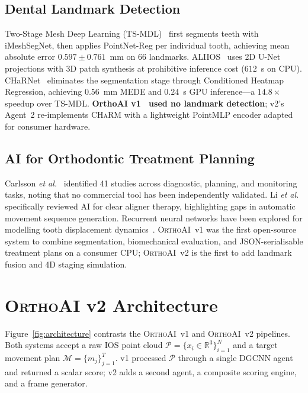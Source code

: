 \documentclass[10pt,twocolumn]{article}
\newcommand{\orthoai}{\textsc{OrthoAI}}
\newcommand{\charm}{\textsc{CHaRM}}
\newcommand{\dgcnn}{\textsc{DGCNN}}
\newcommand{\R}{\mathbb{R}}
\newcommand{\vone}{\orthoai{}~v1}
\newcommand{\vtwo}{\orthoai{}~v2}
\begin{document}
\subsection{Dental Landmark Detection}

Two-Stage Mesh Deep Learning (TS-MDL)~\cite{wu2022tsmdl} first segments
teeth with iMeshSegNet, then applies PointNet-Reg per individual tooth,
achieving mean absolute error $0.597 \pm 0.761$~mm on 66 landmarks.
ALIIOS~\cite{baquero2022aliios} uses 2D U-Net projections with 3D patch
synthesis at prohibitive inference cost ($612$~s on CPU).
CHaRNet~\cite{rodriguez2025charm} eliminates the segmentation stage through
Conditioned Heatmap Regression, achieving $0.56$~mm MEDE and $0.24$~s GPU
inference---a $14.8\times$ speedup over TS-MDL.
\textbf{OrthoAI v1~\cite{lansiaux2026orthoaiv1} used no landmark detection};
v2's Agent~2 re-implements \charm{} with a lightweight PointMLP encoder
adapted for consumer hardware.

\subsection{AI for Orthodontic Treatment Planning}

Carlsson \textit{et al.}~\cite{carlsson2024ai} identified 41 studies across
diagnostic, planning, and monitoring tasks, noting that no commercial tool
has been independently validated.
Li \textit{et al.}~\cite{li2025clear} specifically reviewed AI for clear
aligner therapy, highlighting gaps in automatic movement sequence generation.
Recurrent neural networks have been explored for modelling tooth displacement
dynamics~\cite{woo2020virtual}.
\vone{} was the first open-source system to combine segmentation, biomechanical
evaluation, and JSON-serialisable treatment plans on a consumer CPU;
\vtwo{} is the first to add landmark fusion and 4D staging simulation.

\section{\orthoai{} v2 Architecture}
\label{sec:arch}

Figure~\ref{fig:architecture} contrasts the \vone{} and \vtwo{} pipelines.
Both systems accept a raw IOS point cloud
$\mathcal{P} = \{x_i \in \R^3\}_{i=1}^N$
and a target movement plan $\mathcal{M} = \{m_j\}_{j=1}^T$.
v1 processed $\mathcal{P}$ through a single \dgcnn{} agent and returned
a scalar score; v2 adds a second agent, a composite scoring engine,
and a frame generator.
\end{document}
